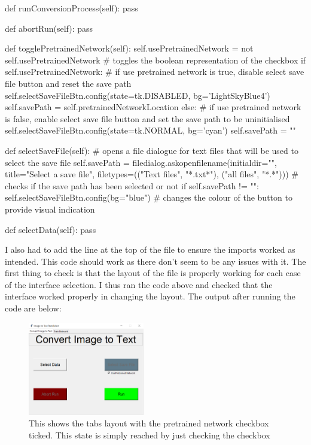 \documentclass{report}
\begin{document}
\begin{python}
    def runConversionProcess(self):
        pass

    def abortRun(self):
        pass

    def togglePretrainedNetwork(self):
        self.usePretrainedNetwork = not self.usePretrainedNetwork  # toggles the boolean representation of the checkbox
        if self.usePretrainedNetwork:
	        # if use pretrained network is true, disable select save file button and reset the save path
            self.selectSaveFileBtn.config(state=tk.DISABLED, bg='LightSkyBlue4')
            self.savePath = self.pretrainedNetworkLocation
        else:
	        # if use pretrained network is false, enable select save file button and set the save path to be uninitialised
            self.selectSaveFileBtn.config(state=tk.NORMAL, bg='cyan')
            self.savePath = ""

    def selectSaveFile(self):
        # opens a file dialogue for text files that will be used to select the save file
        self.savePath = filedialog.askopenfilename(initialdir="",
                            title="Select a save file", 
                            filetypes=(("Text files", "*.txt*"), ("all files", "*.*")))
	    # checks if the save path has been selected or not
        if self.savePath != "":
            self.selectSaveFileBtn.config(bg="blue")  # changes the colour of the button to provide visual indication

    def selectData(self):
        pass
\end{python}
I also had to add the line  at the top of the file to ensure the imports worked as intended. This code should work as there don't seem to be any issues with it. The first thing to check is that the layout of the file is properly working for each case of the interface selection. I thus ran the code above and checked that the interface worked properly in changing the layout. The output after running the code are below:
\begin{figure}[H]
    \centering
    \includegraphics[width=2in]{Images/Development and Testing/Stage 7/Image to Text Conversion Tab/Tests for Select Save File/With Pretrained Network selected.png}
    \caption{This shows the tabs layout with the pretrained network checkbox ticked. This state is simply reached by just checking the checkbox}
\end{figure}
\end{document}
